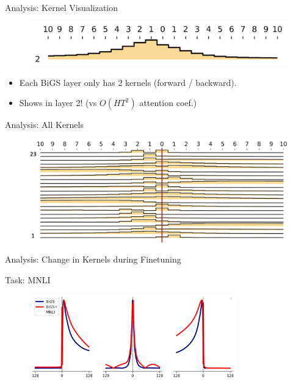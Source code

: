 \documentclass[14pt,aspectratio=169]{beamer}
\begin{document}
\begin{frame}{Analysis: Kernel Visualization}


\begin{figure}
    \centering
    \includegraphics[width=\textwidth]{Figs/kernel1.png}
\end{figure}

\begin{itemize}
    \item Each BiGS layer only has 2 kernels (forward / backward). 
    \item Shows  in layer 2! (vs $O(HT^2)$ attention coef.)
\end{itemize}


\end{frame}

\begin{frame}{Analysis: All Kernels}
\begin{figure}
    \centering
    \includegraphics[height=0.6\textheight]{Figs/kernel2.png}
\end{figure}
\end{frame}

\begin{frame}{Analysis: Change in Kernels during Finetuning }

\centerline{Task: MNLI}
\begin{figure}
    \centering
\includegraphics[width=0.8\textwidth]{Figs/comparison_results.png}
    \end{figure}
\end{frame}
\end{document}
